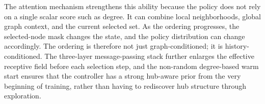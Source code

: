 The attention mechanism strengthens this ability because the policy does not rely on a single scalar score such as degree. It can combine local neighborhoods, global graph context, and the current selected set. As the ordering progresses, the selected-node mask changes the state, and the policy distribution can change accordingly. The ordering is therefore not just graph-conditioned; it is history-conditioned. The three-layer message-passing stack further enlarges the effective receptive field before each selection step, and the non-random degree-based warm start ensures that the controller has a strong hub-aware prior from the very beginning of training, rather than having to rediscover hub structure through exploration.


